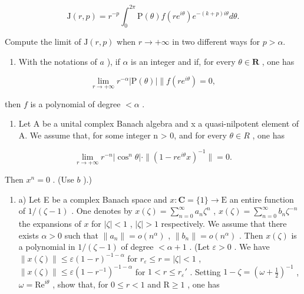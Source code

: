 \[
\mathrm{J} (r, p) = r ^ {- p} \int_ {0} ^ {2 \pi} \mathrm{P} (\theta) f (r e ^ {i \theta}) e ^ {- (k + p) i \theta} d \theta .
\]

Compute the limit of \(\mathrm{J}(r,p)\) when \(r\to+\infty\) in two different ways for \(p>\alpha.\)

\begin{enumerate}
\def\labelenumi{\alph{enumi})}
\setcounter{enumi}{1}
\tightlist
\item
  With the notations of \(a\) ), if \(\alpha\) is an integer and if, for every \(\theta \in \mathbf{R}\) , one has
\end{enumerate}

\[
\lim _ {r \to + \infty} r ^ {- \alpha} | \mathrm{P} (\theta) | \| f (r e ^ {i \theta}) = 0,
\]

then \(f\) is a polynomial of degree \(< \alpha\) .

\begin{enumerate}
\def\labelenumi{\alph{enumi})}
\setcounter{enumi}{2}
\tightlist
\item
  Let A be a unital complex Banach algebra and x a quasi-nilpotent element of A. We assume that, for some integer n \textgreater{} 0, and for every \(\theta \in R\) , one has
\end{enumerate}

\[
\lim _ {r \to + \infty} r ^ {- n} | \cos^ {n} \theta | \cdot \| (1 - r e ^ {i \theta} x) ^ {- 1} \| = 0.
\]

Then \(x^n = 0\) . (Use \(b\) ).)

\begin{enumerate}
\def\labelenumi{¶ \arabic{enumi})}
\setcounter{enumi}{29}
\tightlist
\item
  a) Let E be a complex Banach space and \(x: \mathbf{C}=\{1\}\to\mathrm{E}\) an entire function of \(1/(\zeta-1)\) . One denotes by \(x(\zeta)=\sum_{n=0}^{\infty}a_{n}\zeta^{n}\) , \(x(\zeta)=\sum_{n=0}^{\infty}b_{n}\zeta^{-n}\) the expansions of \(x\) for \(|\zeta|<1\) , \(|\zeta|>1\) respectively. We assume that there exists \(\alpha>0\) such that \(\|a_{n}\|=o(n^{\alpha})\) , \(\|b_{n}\|=o(n^{\alpha})\) . Then \(x(\zeta)\) is a polynomial in \(1 / (\zeta - 1)\) of degree \(< \alpha + 1\) . (Let \(\varepsilon > 0\) . We have \(\|x(\zeta)\| \leqslant \varepsilon(1 - r)^{-1 - \alpha}\) for \(r_{\varepsilon} \leqslant r = |\zeta| < 1\) , \(\|x(\zeta)\| \leqslant \varepsilon(1 - r^{-1})^{-1 - \alpha}\) for \(1 < r \leqslant r_{\varepsilon}'\) . Setting \(1 - \zeta = (\omega + \frac{1}{2})^{-1}\) , \(\omega = \mathrm{Re}^{i\theta}\) , show that, for \(0 \leqslant r < 1\) and \(\mathrm{R} \geqslant 1\) , one has
\end{enumerate}

